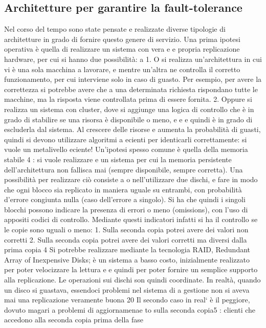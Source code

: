 \subsection{Architetture per garantire la fault-tolerance}
Nel corso del tempo sono state pensate e realizzate diverse tipologie di architetture in grado di fornire questo genere
di servizio.
Una prima ipotesi operativa è quella di realizzare un sistema con vera e
e
propria replicazione hardware, per cui si hanno due possibilità:
a
1. O si realizza un'architettura in cui vi è una sola macchina a lavorare,
e
mentre un'altra ne controlla il corretto funzionamento, per cui interviene
solo in caso di guasto. Per esempio, per avere la correttezza si potrebbe
avere che a una determinata richiesta rispondano tutte le macchine, ma
la risposta viene controllata prima di essere fornita.
2. Oppure si realizza un sistema con cluster, dove si aggiunge una logica di
controllo che è in grado di stabilire se una risorsa è disponibile o meno,
e
e
e quindi è in grado di escluderla dal sistema. Al crescere delle risorse
e
aumenta la probabilità di guasti, quindi si devono utilizzare algoritmi
a
ecienti per identicarli correttamente: si vuole un metalivello eciente!
Un'ipotesi spesso comune è quella della memoria stabile 4 : si vuole realizzare
e
un sistema per cui la memoria persistente dell'architettura non fallisca mai
(sempre disponibile, sempre corretta). Una possibilità per realizzare ciò consiste
a
o
nell'utilizzare due dischi, e fare in modo che ogni blocco sia replicato in maniera
uguale su entrambi, con probabilità d'errore congiunta nulla (caso dell'errore
a
singolo). Si ha che quindi i singoli blocchi possono indicare la presenza di errori
o meno (omissions), con l'uso di appositi codici di controllo. Mediante questi
indicatori infatti si ha il controllo se le copie sono uguali o meno:
1. Sulla seconda copia potrei avere dei valori non corretti
2. Sulla seconda copia potrei avere dei valori corretti ma diversi dalla prima
copia
4 Si potrebbe realizzare mediante la tecnologia RAID, Redundant Array of Inexpensive
Disks; è un sistema a basso costo, inizialmente realizzato per poter velocizzare la lettura e
e
quindi per poter fornire un semplice supporto alla replicazione. Le operazioni sui dischi son
quindi coordinate. In realtà, quando un disco si guastava, essendoci problemi nel sistema di
a
gestione non si aveva mai una replicazione veramente buona
20
Il secondo caso in real` è il peggiore, dovuto magari a problemi di aggiornamenae
to sulla seconda copia5 : clienti che accedono alla seconda copia prima della fase
